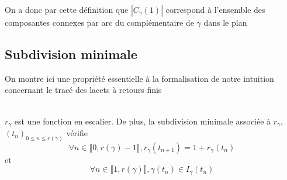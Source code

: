 \documentclass{article}
\begin{document}
\begin{flushleft}
\vspace{0.5cm}
On a donc par cette définition que $|C_{\gamma}(1)|$ correspond à l'ensemble des composantes connexes par arc du
complémentaire de $\gamma$ dans le plan

\subsection{Subdivision minimale}

On montre ici une propriété essentielle à la formalisation de notre intuition concernant le tracé des lacets à retours finis
\\~\\
\begin{tcolorbox}[colback=purple!20!white, colframe=purple!60!white, title = Proposition 9]
    $r_{\gamma}$ est une fonction en escalier. De plus, la subdivision minimale
    associée à $r_{\gamma}$, $(t_n)_{0 \leq n \leq r(\gamma)}$ vérifie
    \[\forall n \in \llbracket 0, r(\gamma) -1 \rrbracket, r_{\gamma}(t_{n+1}) = 1 + r_{\gamma}(t_n)\]
    et
    \[ \forall n \in \llbracket 1, r(\gamma) \rrbracket, \gamma(t_n) \in I_{\gamma}(t_n) \]
\end{tcolorbox}
\vspace{0.5cm}


\end{flushleft}
\end{document}
